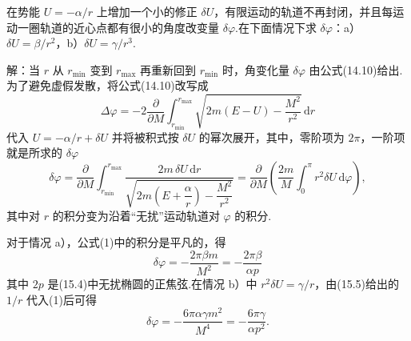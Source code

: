 \begin{xiti}
\quad 在势能 $U=-\alpha/r$ 上增加一个小的修正 $\delta U$，有限运动的轨道不再封闭，并且每运动一圈轨道的近心点都有很小的角度改变量 $\delta\varphi$.在下面情况下求 $\delta\varphi$：a）$\delta U=\beta/r^2$，b）$\delta U=\gamma/r^3$.

解：当 $r$ 从 $r_{\min}$ 变到 $r_{\max}$ 再重新回到 $r_{\min}$ 时，角变化量 $\delta\varphi$ 由公式(14.10)给出.为了避免虚假发散，将公式(14.10)改写成
\begin{equation*}
  \Delta\varphi=-2\frac{\partial}{\partial M}
  \int_{r_{\min}}^{r_{\max}}
  \sqrt{2m(E-U)-\frac{M^2}{r^2}}\,\mathrm{d}r
\end{equation*}
代入 $U=-\alpha/r+\delta U$ 并将被积式按 $\delta U$ 的幂次展开，其中，零阶项为 $2\pi$，一阶项就是所求的 $\delta\varphi$
\begin{equation*}
  \delta\varphi=\frac{\partial}{\partial M}
  \int_{r_{\min}}^{r_{\max}}
  \frac{2m\,\delta U\,\mathrm{d}r}
  {\sqrt{2m\left(E+\dfrac{\alpha}{r}\right)
  -\dfrac{M^2}{r^2}}}
  =\frac{\partial}{\partial M}\left(\frac{2m}{M}
  \int_0^{\pi}r^2\delta U\,\mathrm{d}\varphi\right),
\tag{1}
\end{equation*}
其中对 $r$ 的积分变为沿着“无扰”运动轨道对 $\varphi$ 的积分.

对于情况 a），公式(1)中的积分是平凡的，得
\begin{equation*}
  \delta\varphi=-\frac{2\pi\beta m}{M^2}
  =-\frac{2\pi\beta}{\alpha p}
\end{equation*}
其中 $2p$ 是(15.4)中无扰椭圆的正焦弦.在情况 b）中 $r^2\delta U=\gamma/r$，由(15.5)给出的 $1/r$ 代入(1)后可得
\begin{equation*}
  \delta\varphi=-\frac{6\pi\alpha\gamma m^2}{M^4}
  =-\frac{6\pi\gamma}{\alpha p^2}.
\end{equation*}

\end{xiti}

